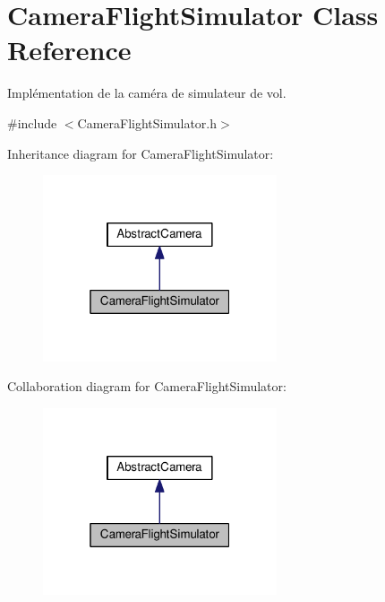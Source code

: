 \hypertarget{classCameraFlightSimulator}{\section{Camera\+Flight\+Simulator Class Reference}
\label{classCameraFlightSimulator}
}


Implémentation de la caméra de simulateur de vol.  




{\ttfamily \#include $<$Camera\+Flight\+Simulator.\+h$>$}



Inheritance diagram for Camera\+Flight\+Simulator\+:\nopagebreak
\begin{figure}[H]
\begin{center}
\leavevmode
\includegraphics[width=196pt]{classCameraFlightSimulator__inherit__graph}
\end{center}
\end{figure}


Collaboration diagram for Camera\+Flight\+Simulator\+:\nopagebreak
\begin{figure}[H]
\begin{center}
\leavevmode
\includegraphics[width=196pt]{classCameraFlightSimulator__coll__graph}
\end{center}
\end{figure}
